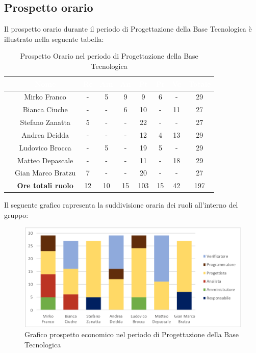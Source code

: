 \subsection{Prospetto orario}
Il prospetto orario durante il periodo di Progettazione della Base Tecnologica è illustrato nella seguente tabella:

\begin{table}[ht]
	\caption{Prospetto Orario nel periodo di Progettazione della Base Tecnologica}
	\begin{center}
		\begin{tabular}{ccccccccc}
			\rowcolor{lightblue}
			\hline
			& \textcolor{white}{Nome} & \textcolor{white}{Re} & \textcolor{white}{Am} & \textcolor{white}{An} & \textcolor{white}{Pt} &\textcolor{white}{Pr} & \textcolor{white}{Ve} & \textcolor{white}{Totale} \\
			\hline
			
			&Mirko Franco & - & 5 & 9 & 9 & 6 & - & 29  \\
			&Bianca Ciuche & -& - & 6 & 10 & - & 11 & 27 \\
			&Stefano Zanatta & 5 & - & - & 22 & - & - & 27 \\
			&Andrea Deidda &  -& - & - & 12 & 4 & 13 & 29 \\
			&Ludovico Brocca & -& 5 & - & 19 & 5 & - & 29 \\
			&Matteo Depascale & -& - & - & 11 & - & 18 & 29 \\
			&Gian Marco Bratzu & 7& - & - & 20 & - & - & 27 \\
			\hline
			&\textbf{Ore totali ruolo} & 12 & 10 & 15 & 103 & 15 & 42 & 197 \\
			
		\end{tabular}
	\end{center}
\end{table}

Il seguente grafico rapresenta la suddivisione oraria dei ruoli all'interno del gruppo:
\begin{figure}[!ht]
	\begin{center}
		\includegraphics[scale=0.80]{images/grafoProgettazioneTecnologica.png}
		\caption{Grafico prospetto economico nel periodo di Progettazione della Base Tecnologica}
	\end{center}
\end{figure}
\newpage
